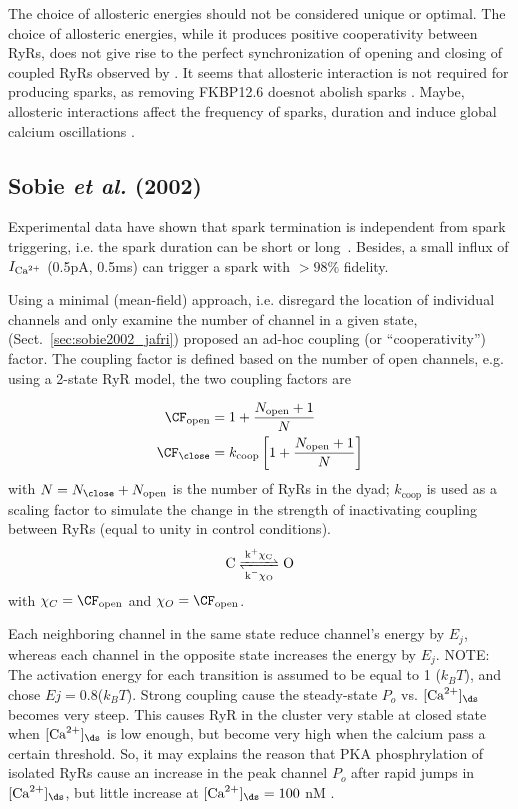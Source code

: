 The choice of allosteric energies should not be considered unique or optimal.
The choice of allosteric energies, while it produces positive cooperativity
between RyRs, does not give rise to the perfect synchronization of opening and
closing of coupled RyRs observed by \citep{marx1998}. It seems that allosteric
interaction is not required for producing sparks, as removing FKBP12.6 doesnot
abolish sparks \citep{mccall1996}. Maybe, allosteric interactions affect the
frequency of sparks, duration and induce global calcium oscillations
\citep{xiao1997}.


\subsection{Sobie {\it et al.} (2002)}
\label{sec:RYR_Sobie2002}

Experimental data have shown that spark termination is independent
from spark triggering, i.e. the spark duration can be short or
long~\citep{cheng1993cse}. Besides, a small influx of $I_{\text{Ca}^{2+}}$ (0.5pA,
0.5ms) can trigger a spark with $>98\%$ fidelity.

Using a minimal (mean-field) approach, i.e. disregard the location of
individual channels and only examine the number of channel in a given
state, ~\citep{sobie2002tcas}
(Sect.~\ref{sec:sobie2002_jafri}) proposed an ad-hoc coupling (or
``cooperativity'') factor. The coupling factor is defined based on the number
of open channels, e.g. using a 2-state RyR model, the two coupling
factors are

\begin{equation}
  \label{eq:1134}
  \begin{split}
    \CF_\open &= 1 + \frac{N_\open + 1}{N}\\
    \CF_\close &= k_\text{coop}\left[1 + \frac{N_\open + 1}{N}\right]\\
  \end{split}
\end{equation}
with $N=N_\close+N_\open$ is the number of RyRs in the dyad;
$k_\text{coop}$ is used as a scaling factor to simulate the change in
the strength of inactivating coupling between RyRs (equal to unity in
control conditions).
\begin{equation}
  \label{eq:1215}
  \ce{ C <=>[k^+\chi_C][k^-\chi_O] O}
\end{equation}
with $\chi_C = \CF_\open$ and $\chi_O=\CF_\open$.

Each neighboring channel in the same state reduce channel's energy by $E_j$,
whereas each channel in the opposite state increases the energy by $E_j$. NOTE:
The activation energy for each transition is assumed to be equal to 1 ($k_BT$),
and \citep{sobie2006} chose $Ej=0.8$($k_BT$). Strong coupling cause the
steady-state $P_o$ vs. $[\Ca]_\ds$ becomes very steep. This causes RyR in the
cluster very stable at closed state when $[\Ca]_\ds$ is low enough, but become
very high when the calcium pass a certain threshold. So, it may explains the
reason that PKA phosphrylation of isolated RyRs cause an increase in the peak
channel $P_o$ after rapid jumps in $[\Ca]_\ds$, but little increase at
$[\Ca]_\ds=100$ nM \citep{valdivia1995}.

